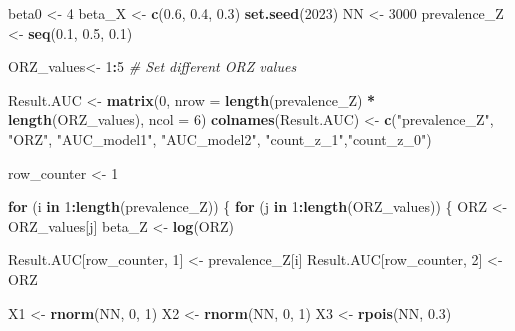 \documentclass[
]{article}
\newenvironment{Shaded}{\begin{snugshade}}{\end{snugshade}}
\newcommand{\AttributeTok}[1]{\textcolor[rgb]{0.13,0.29,0.53}{#1}}
\newcommand{\CommentTok}[1]{\textcolor[rgb]{0.56,0.35,0.01}{\textit{#1}}}
\newcommand{\ControlFlowTok}[1]{\textcolor[rgb]{0.13,0.29,0.53}{\textbf{#1}}}
\newcommand{\DecValTok}[1]{\textcolor[rgb]{0.00,0.00,0.81}{#1}}
\newcommand{\FloatTok}[1]{\textcolor[rgb]{0.00,0.00,0.81}{#1}}
\newcommand{\FunctionTok}[1]{\textcolor[rgb]{0.13,0.29,0.53}{\textbf{#1}}}
\newcommand{\NormalTok}[1]{#1}
\newcommand{\OtherTok}[1]{\textcolor[rgb]{0.56,0.35,0.01}{#1}}
\newcommand{\SpecialCharTok}[1]{\textcolor[rgb]{0.81,0.36,0.00}{\textbf{#1}}}
\newcommand{\StringTok}[1]{\textcolor[rgb]{0.31,0.60,0.02}{#1}}
\begin{document}
\begin{Shaded}
\begin{Highlighting}[]
\NormalTok{beta0 }\OtherTok{\textless{}{-}} \DecValTok{4}
\NormalTok{beta\_X }\OtherTok{\textless{}{-}} \FunctionTok{c}\NormalTok{(}\FloatTok{0.6}\NormalTok{, }\FloatTok{0.4}\NormalTok{, }\FloatTok{0.3}\NormalTok{)}
\FunctionTok{set.seed}\NormalTok{(}\DecValTok{2023}\NormalTok{)}
\NormalTok{NN }\OtherTok{\textless{}{-}} \DecValTok{3000}
\NormalTok{prevalence\_Z }\OtherTok{\textless{}{-}} \FunctionTok{seq}\NormalTok{(}\FloatTok{0.1}\NormalTok{, }\FloatTok{0.5}\NormalTok{, }\FloatTok{0.1}\NormalTok{)}

\NormalTok{ORZ\_values}\OtherTok{\textless{}{-}} \DecValTok{1}\SpecialCharTok{:}\DecValTok{5}  \CommentTok{\# Set different ORZ values }

\NormalTok{Result.AUC }\OtherTok{\textless{}{-}} \FunctionTok{matrix}\NormalTok{(}\DecValTok{0}\NormalTok{, }\AttributeTok{nrow =} \FunctionTok{length}\NormalTok{(prevalence\_Z) }\SpecialCharTok{*} \FunctionTok{length}\NormalTok{(ORZ\_values), }\AttributeTok{ncol =} \DecValTok{6}\NormalTok{)}
\FunctionTok{colnames}\NormalTok{(Result.AUC) }\OtherTok{\textless{}{-}} \FunctionTok{c}\NormalTok{(}\StringTok{"prevalence\_Z"}\NormalTok{, }\StringTok{"ORZ"}\NormalTok{, }\StringTok{"AUC\_model1"}\NormalTok{, }\StringTok{"AUC\_model2"}\NormalTok{, }\StringTok{"count\_z\_1"}\NormalTok{,}\StringTok{"count\_z\_0"}\NormalTok{)}

\NormalTok{row\_counter }\OtherTok{\textless{}{-}} \DecValTok{1}


\ControlFlowTok{for}\NormalTok{ (i }\ControlFlowTok{in} \DecValTok{1}\SpecialCharTok{:}\FunctionTok{length}\NormalTok{(prevalence\_Z)) \{}
  \ControlFlowTok{for}\NormalTok{ (j }\ControlFlowTok{in} \DecValTok{1}\SpecialCharTok{:}\FunctionTok{length}\NormalTok{(ORZ\_values)) \{}
\NormalTok{    ORZ }\OtherTok{\textless{}{-}}\NormalTok{ ORZ\_values[j]}
\NormalTok{    beta\_Z }\OtherTok{\textless{}{-}} \FunctionTok{log}\NormalTok{(ORZ)}
    
\NormalTok{    Result.AUC[row\_counter, }\DecValTok{1}\NormalTok{] }\OtherTok{\textless{}{-}}\NormalTok{ prevalence\_Z[i]}
\NormalTok{    Result.AUC[row\_counter, }\DecValTok{2}\NormalTok{] }\OtherTok{\textless{}{-}}\NormalTok{ ORZ}
    
\NormalTok{    X1 }\OtherTok{\textless{}{-}} \FunctionTok{rnorm}\NormalTok{(NN, }\DecValTok{0}\NormalTok{, }\DecValTok{1}\NormalTok{)}
\NormalTok{    X2 }\OtherTok{\textless{}{-}} \FunctionTok{rnorm}\NormalTok{(NN, }\DecValTok{0}\NormalTok{, }\DecValTok{1}\NormalTok{)}
\NormalTok{    X3 }\OtherTok{\textless{}{-}} \FunctionTok{rpois}\NormalTok{(NN, }\FloatTok{0.3}\NormalTok{)}
    

\end{Highlighting}
\end{Shaded}
\end{document}
